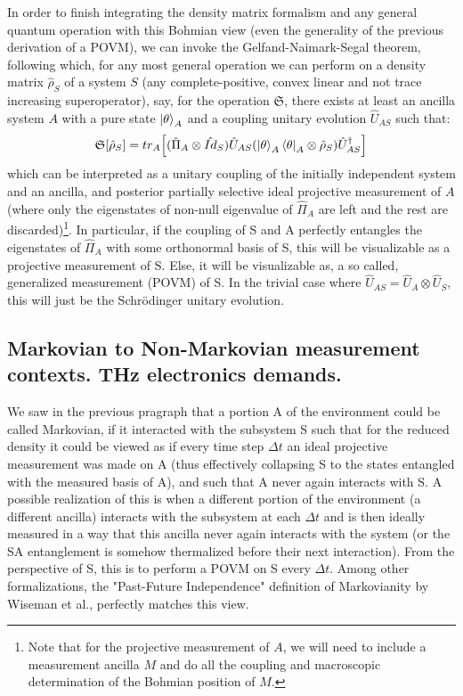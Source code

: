 \documentclass[11pt, a4paper]{article} %
\begin{document}
In order to finish integrating the density matrix formalism and any general quantum operation with this Bohmian view (even the generality of the previous derivation of a POVM), we can invoke the Gelfand-Naimark-Segal theorem, following which, for any most general operation we can perform on a density matrix $\hat{\rho}_S$ of a system $S$ (any complete-positive, convex linear and not trace increasing superoperator), say, for the operation $\mathfrak{S}$, there exists at least an ancilla system $A$ with a pure state $\ket{\theta}_A$ and a coupling unitary evolution $\hat{U}_{AS}$ such that:
\begin{equation}
\mathfrak{S}[\hat{\rho}_S]=tr_A\qty[ (\hat{\Pi}_A\otimes \hat{Id}_S)  \hat{U}_{AS}\qty(\ket{\theta}_A\bra{\theta}_A\otimes \hat{\rho}_S)\hat{U}_{AS}^\dagger]
\end{equation}
which can be interpreted as a unitary coupling of the initially independent system and an ancilla, and posterior partially selective ideal projective measurement of $A$ (where only the eigenstates of non-null eigenvalue of $\hat{\Pi}_A$ are left and the rest are discarded)\footnote{Note that for the projective measurement of $A$, we will need to include a measurement ancilla $M$ and do all the coupling and macroscopic determination of the Bohmian position of $M$.}. In particular, if the coupling of S and A perfectly entangles the eigenstates of $\hat{\Pi}_A$ with some orthonormal basis of S, this will be visualizable as a projective measurement of S. Else, it will be visualizable as, a so called, generalized measurement (POVM) of S. In the trivial case where $\hat{U}_{AS}=\hat{U}_A\otimes\hat{U}_S$, this will just be the Schrödinger unitary evolution.


\subsection*{Markovian to Non-Markovian measurement contexts. THz electronics demands.}
We saw in the previous pragraph that a portion A of the environment could be called Markovian, if it interacted with the subsystem S such that for the reduced density it could be viewed as if every time step $\Delta t$ an ideal projective measurement was made on A (thus effectively collapsing S to the states entangled with the measured basis of A), and such that A never again interacts with S. A possible realization of this is when a different portion of the environment (a different ancilla) interacts with the subsystem at each $\Delta t$  and is then ideally measured in a way that this ancilla never again interacts with the system (or the SA entanglement is somehow thermalized before their next interaction). From the perspective of S, this is to perform a POVM on S every $\Delta t$. Among other formalizations, the "Past-Future Independence" definition of Markovianity by Wiseman et al.\cite{MarkovianityDefs}, perfectly matches this view.
\end{document}
